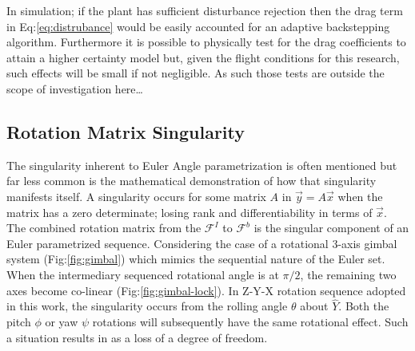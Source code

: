 \par
In simulation; if the plant has sufficient disturbance rejection then the drag term in Eq:\ref{eq:distrubance} would be easily accounted for an adaptive backstepping algorithm. Furthermore it is possible to physically test for the drag coefficients to attain a higher certainty model but, given the flight conditions for this research, such effects will be small if not negligible. As such those tests are outside the scope of investigation here\ldots
\subsection{Rotation Matrix Singularity}\label{subsec:dynamics.rigidbody.singularity}
The singularity inherent to Euler Angle parametrization is often mentioned but far less common is the mathematical demonstration of how that singularity manifests itself.  A singularity occurs for some matrix $A$ in $\vec{y}=A\vec{x}$ when the matrix has a zero determinate; losing rank and differentiability in terms of $\vec{x}$. The combined rotation matrix from the $\mathcal{F}^{I}$ to $\mathcal{F}^{b}$ is the singular component of an Euler parametrized sequence. Considering the case of a rotational 3-axis gimbal system (Fig:\ref{fig:gimbal}) which mimics the sequential nature of the Euler set. When the intermediary sequenced rotational angle is at $\pi/2$, the remaining two axes become co-linear (Fig:\ref{fig:gimbal-lock}). In Z-Y-X rotation sequence adopted in this work, the singularity occurs from the rolling angle $\theta$ about $\hat{Y}$. Both the pitch $\phi$ or yaw $\psi$ rotations will subsequently have the same rotational effect. Such a situation results in as a loss of a degree of freedom.
